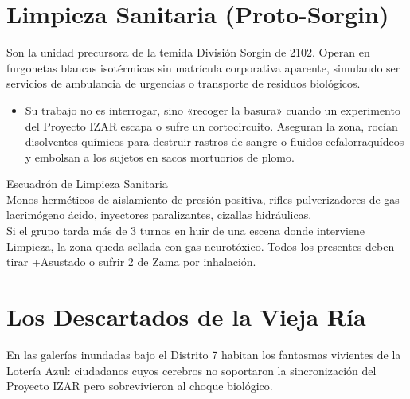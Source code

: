 \section{Limpieza Sanitaria (Proto-Sorgin)}


Son la unidad precursora de la temida División Sorgin de 2102. Operan en furgonetas blancas isotérmicas sin matrícula corporativa aparente, simulando ser servicios de ambulancia de urgencias o transporte de residuos biológicos.

\begin{itemize}
  \item {} Su trabajo no es interrogar, sino «recoger la basura» cuando un experimento del Proyecto IZAR escapa o sufre un cortocircuito. Aseguran la zona, rocían disolventes químicos para destruir rastros de sangre o fluidos cefalorraquídeos y embolsan a los sujetos en sacos mortuorios de plomo.
\end{itemize}

\begin{FichaEnemigo}{Escuadrón de Limpieza Sanitaria}
    \\
 Monos herméticos de aislamiento de presión positiva, rifles pulverizadores de gas lacrimógeno ácido, inyectores paralizantes, cizallas hidráulicas.\\
 Si el grupo tarda más de 3 turnos en huir de una escena donde interviene Limpieza, la zona queda sellada con gas neurotóxico. Todos los presentes deben tirar +Asustado o sufrir 2 de Zama por inhalación.
\end{FichaEnemigo}

\section{Los Descartados de la Vieja Ría}


En las galerías inundadas bajo el Distrito 7 habitan los fantasmas vivientes de la Lotería Azul: ciudadanos cuyos cerebros no soportaron la sincronización del Proyecto IZAR pero sobrevivieron al choque biológico.

